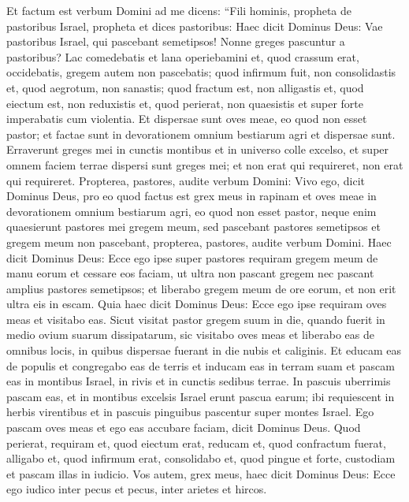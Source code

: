 \begin{biblechapter}  
\verse Et factum est verbum Domini ad me dicens: 
\verse “Fili hominis, propheta de pastoribus Israel, propheta et dices pastoribus: Haec dicit Dominus Deus: Vae pastoribus Israel, qui pascebant semetipsos! Nonne greges pascuntur a pastoribus? 
\verse Lac comedebatis et lana operiebamini et, quod crassum erat, occidebatis, gregem autem non pascebatis; 
\verse quod infirmum fuit, non consolidastis et, quod aegrotum, non sanastis; quod fractum est, non alligastis et, quod eiectum est, non reduxistis et, quod perierat, non quaesistis et super forte imperabatis cum violentia. 
\verse Et dispersae sunt oves meae, eo quod non esset pastor; et factae sunt in devorationem omnium bestiarum agri et dispersae sunt. 
\verse Erraverunt greges mei in cunctis montibus et in universo colle excelso, et super omnem faciem terrae dispersi sunt greges mei; et non erat qui requireret, non erat qui requireret. 
\verse Propterea, pastores, audite verbum Domini: 
\verse Vivo ego, dicit Dominus Deus, pro eo quod factus est grex meus in rapinam et oves meae in devorationem omnium bestiarum agri, eo quod non esset pastor, neque enim quaesierunt pastores mei gregem meum, sed pascebant pastores semetipsos et gregem meum non pascebant,  
\verse propterea, pastores, audite verbum Domini. 
\verse Haec dicit Dominus Deus: Ecce ego ipse super pastores requiram gregem meum de manu eorum et cessare eos faciam, ut ultra non pascant gregem nec pascant amplius pastores semetipsos; et liberabo gregem meum de ore eorum, et non erit ultra eis in escam. 
\verse Quia haec dicit Dominus Deus: Ecce ego ipse requiram oves meas et visitabo eas. 
\verse Sicut visitat pastor gregem suum in die, quando fuerit in medio ovium suarum dissipatarum, sic visitabo oves meas et liberabo eas de omnibus locis, in quibus dispersae fuerant in die nubis et caliginis. 
\verse Et educam eas de populis et congregabo eas de terris et inducam eas in terram suam et pascam eas in montibus Israel, in rivis et in cunctis sedibus terrae. 
\verse In pascuis uberrimis pascam eas, et in montibus excelsis Israel erunt pascua earum; ibi requiescent in herbis virentibus et in pascuis pinguibus pascentur super montes Israel. 
\verse Ego pascam oves meas et ego eas accubare faciam, dicit Dominus Deus. 
\verse Quod perierat, requiram et, quod eiectum erat, reducam et, quod confractum fuerat, alligabo et, quod infirmum erat, consolidabo et, quod pingue et forte, custodiam et pascam illas in iudicio. 
\verse Vos autem, grex meus, haec dicit Dominus Deus: Ecce ego iudico inter pecus et pecus, inter arietes et hircos. 

\end{biblechapter}
